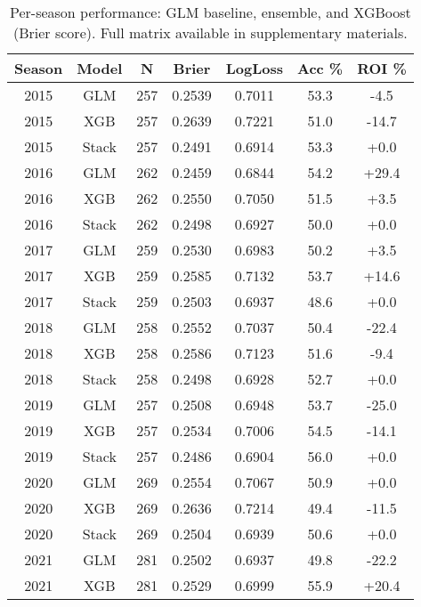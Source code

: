 \begin{table}[t]
  \centering
  \footnotesize
  \caption[Per-season performance (top 3 models)]{Per-season performance: GLM baseline, ensemble, and XGBoost (Brier score). Full matrix available in supplementary materials.}
  \label{tab:per-season-top3}
  \setlength{\tabcolsep}{2.5pt}\renewcommand{\arraystretch}{1.08}
  \begin{tabular}{@{} c c c c c c c @{} }
    \toprule
    \textbf{Season} & \textbf{Model} & \textbf{N} & \textbf{Brier} & \textbf{LogLoss} & \textbf{Acc \%} & \textbf{ROI \%} \\
    \midrule
    2015 & GLM & 257 & 0.2539 & 0.7011 & 53.3 & -4.5 \\
    2015 & XGB & 257 & 0.2639 & 0.7221 & 51.0 & -14.7 \\
    2015 & Stack & 257 & 0.2491 & 0.6914 & 53.3 & +0.0 \\
    \midrule
    2016 & GLM & 262 & 0.2459 & 0.6844 & 54.2 & +29.4 \\
    2016 & XGB & 262 & 0.2550 & 0.7050 & 51.5 & +3.5 \\
    2016 & Stack & 262 & 0.2498 & 0.6927 & 50.0 & +0.0 \\
    \midrule
    2017 & GLM & 259 & 0.2530 & 0.6983 & 50.2 & +3.5 \\
    2017 & XGB & 259 & 0.2585 & 0.7132 & 53.7 & +14.6 \\
    2017 & Stack & 259 & 0.2503 & 0.6937 & 48.6 & +0.0 \\
    \midrule
    2018 & GLM & 258 & 0.2552 & 0.7037 & 50.4 & -22.4 \\
    2018 & XGB & 258 & 0.2586 & 0.7123 & 51.6 & -9.4 \\
    2018 & Stack & 258 & 0.2498 & 0.6928 & 52.7 & +0.0 \\
    \midrule
    2019 & GLM & 257 & 0.2508 & 0.6948 & 53.7 & -25.0 \\
    2019 & XGB & 257 & 0.2534 & 0.7006 & 54.5 & -14.1 \\
    2019 & Stack & 257 & 0.2486 & 0.6904 & 56.0 & +0.0 \\
    \midrule
    2020 & GLM & 269 & 0.2554 & 0.7067 & 50.9 & +0.0 \\
    2020 & XGB & 269 & 0.2636 & 0.7214 & 49.4 & -11.5 \\
    2020 & Stack & 269 & 0.2504 & 0.6939 & 50.6 & +0.0 \\
    \midrule
    2021 & GLM & 281 & 0.2502 & 0.6937 & 49.8 & -22.2 \\
    2021 & XGB & 281 & 0.2529 & 0.6999 & 55.9 & +20.4 \\

\end{tabular}
\end{table}
